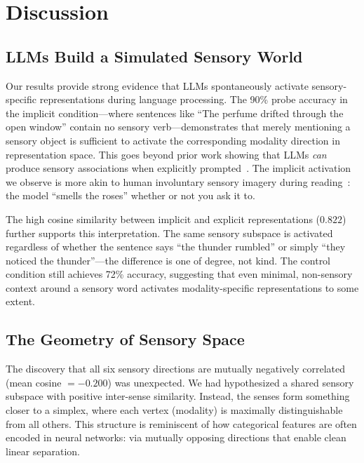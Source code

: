 \section{Discussion}
\label{sec:discussion}

\subsection{LLMs Build a Simulated Sensory World}

Our results provide strong evidence that LLMs spontaneously activate sensory-specific representations during language processing. The 90\% probe accuracy in the implicit condition---where sentences like ``The perfume drifted through the open window'' contain no sensory verb---demonstrates that merely mentioning a sensory object is sufficient to activate the corresponding modality direction in representation space. This goes beyond prior work showing that LLMs \emph{can} produce sensory associations when explicitly prompted~\citep{wang2025words, marjieh2023large}. The implicit activation we observe is more akin to human involuntary sensory imagery during reading~\citep{barsalou1999perceptual}: the model ``smells the roses'' whether or not you ask it to.

The high cosine similarity between implicit and explicit representations ($0.822$) further supports this interpretation. The same sensory subspace is activated regardless of whether the sentence says ``the thunder rumbled'' or simply ``they noticed the thunder''---the difference is one of degree, not kind. The control condition still achieves 72\% accuracy, suggesting that even minimal, non-sensory context around a sensory word activates modality-specific representations to some extent.

\subsection{The Geometry of Sensory Space}

The discovery that all six sensory directions are mutually negatively correlated (mean cosine $= -0.200$) was unexpected. We had hypothesized a shared sensory subspace with positive inter-sense similarity. Instead, the senses form something closer to a simplex, where each vertex (modality) is maximally distinguishable from all others. This structure is reminiscent of how categorical features are often encoded in neural networks: via mutually opposing directions that enable clean linear separation.

